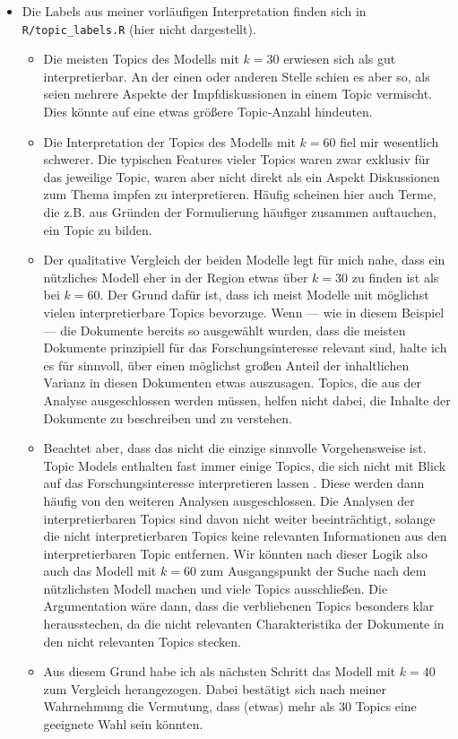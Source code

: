 \documentclass[
]{book}
\providecommand{\tightlist}{%
  \setlength{\itemsep}{0pt}\setlength{\parskip}{0pt}}
\begin{document}
\begin{itemize}
\tightlist
\item
  Die Labels aus meiner vorläufigen Interpretation finden sich in \texttt{R/topic\_labels.R} (hier nicht dargestellt).

  \begin{itemize}
  \tightlist
  \item
    Die meisten Topics des Modells mit \(k = 30\) erwiesen sich als gut interpretierbar. An der einen oder anderen Stelle schien es aber so, als seien mehrere Aspekte der Impfdiskussionen in einem Topic vermischt. Dies könnte auf eine etwas größere Topic-Anzahl hindeuten.
  \item
    Die Interpretation der Topics des Modells mit \(k = 60\) fiel mir wesentlich schwerer. Die typischen Features vieler Topics waren zwar exklusiv für das jeweilige Topic, waren aber nicht direkt als ein Aspekt Diskussionen zum Thema impfen zu interpretieren. Häufig scheinen hier auch Terme, die z.B. aus Gründen der Formulierung häufiger zusammen auftauchen, ein Topic zu bilden.
  \item
    Der qualitative Vergleich der beiden Modelle legt für mich nahe, dass ein nützliches Modell eher in der Region etwas über \(k = 30\) zu finden ist als bei \(k = 60\). Der Grund dafür ist, dass ich meist Modelle mit möglichst vielen interpretierbare Topics bevorzuge. Wenn --- wie in diesem Beispiel --- die Dokumente bereits so ausgewählt wurden, dass die meisten Dokumente prinzipiell für das Forschungsinteresse relevant sind, halte ich es für sinnvoll, über einen möglichst großen Anteil der inhaltlichen Varianz in diesen Dokumenten etwas auszusagen. Topics, die aus der Analyse ausgeschlossen werden müssen, helfen nicht dabei, die Inhalte der Dokumente zu beschreiben und zu verstehen.
  \item
    Beachtet aber, dass das nicht die einzige sinnvolle Vorgehensweise ist. Topic Models enthalten fast immer einige Topics, die sich nicht mit Blick auf das Forschungsinteresse interpretieren lassen \citep{maierApplyingLDATopic2018}. Diese werden dann häufig von den weiteren Analysen ausgeschlossen. Die Analysen der interpretierbaren Topics sind davon nicht weiter beeinträchtigt, solange die nicht interpretierbaren Topics keine relevanten Informationen aus den interpretierbaren Topic entfernen. Wir könnten nach dieser Logik also auch das Modell mit \(k = 60\) zum Ausgangspunkt der Suche nach dem nützlichsten Modell machen und viele Topics ausschließen. Die Argumentation wäre dann, dass die verbliebenen Topics besonders klar herausstechen, da die nicht relevanten Charakteristika der Dokumente in den nicht relevanten Topics stecken.
  \item
    Aus diesem Grund habe ich als nächsten Schritt das Modell mit \(k = 40\) zum Vergleich herangezogen. Dabei bestätigt sich nach meiner Wahrnehmung die Vermutung, dass (etwas) mehr als 30 Topics eine geeignete Wahl sein könnten.
  \end{itemize}
\end{itemize}
\end{document}
